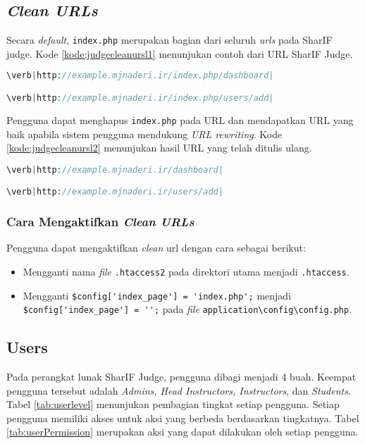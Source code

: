\begin{enumerate}
\end{enumerate}

\subsection{\textit{Clean URLs}}
\label{sec:cleanurls}
Secara \textit{default}, \verb|index.php| merupakan bagian dari seluruh \textit{urls} pada SharIF judge. Kode \ref{kode:judgecleanursl1} menunjukan contoh dari URL SharIF Judge.

\begin{lstlisting}[language=PHP, caption=Contoh URL \textit{SharIF Judge}, label=kode:judgecleanursl1]
\verb|http://example.mjnaderi.ir/index.php/dashboard|

\verb|http://example.mjnaderi.ir/index.php/users/add|
\end{lstlisting}

Pengguna dapat menghapus \verb|index.php| pada URL dan mendapatkan URL yang baik apabila sistem pengguna mendukung \textit{URL rewriting}. Kode \ref{kode:judgecleanursl2} menunjukan hasil URL yang telah ditulis ulang.

\begin{lstlisting}[language=PHP, caption=Contoh hasil URL \textit{SharIF Judge} yang telah ditulis ulang, label=kode:judgecleanursl2]
\verb|http://example.mjnaderi.ir/dashboard|

\verb|http://example.mjnaderi.ir/users/add|
\end{lstlisting}

\subsubsection{Cara Mengaktifkan \textit{Clean URLs}}
Pengguna dapat mengaktifkan \textit{clean} url dengan cara sebagai berikut:
\begin{itemize}
\item Mengganti nama \textit{file} \verb|.htaccess2| pada direktori utama menjadi \verb|.htaccess|.
\item Mengganti \verb|$config['index_page'] = 'index.php';| menjadi \verb|$config['index_page'] = '';| pada \textit{file} \verb|application\config\config.php|.
\end{itemize}

\subsection{Users}
\label{sec:users}
Pada perangkat lunak SharIF Judge, pengguna dibagi menjadi 4 buah. Keempat pengguna tersebut adalah \textit{Admins, Head Instructors, Instructors}, dan\textit{ Students}. Tabel \ref{tab:userlevel} menunjukan pembagian tingkat setiap pengguna. Setiap pengguna memiliki akses untuk aksi yang berbeda berdasarkan tingkatnya. Tabel \ref{tab:userPermission} merupakan aksi yang dapat dilakukan oleh setiap pengguna.

